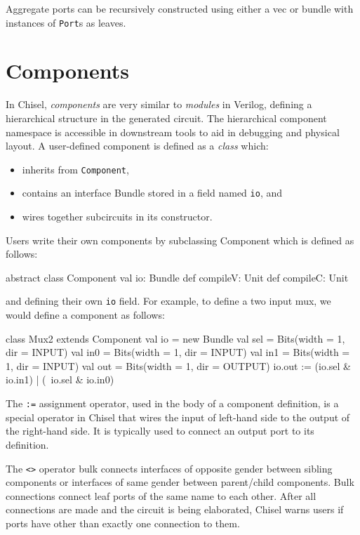 \documentclass[10pt,twocolumn]{article}
\def\code#1{{\small\tt #1}}
\begin{document}
\noindent
Aggregate ports can be recursively constructed using either a vec or
bundle with instances of \code{Port}s as leaves.  

\section{Components}

In Chisel, {\em components} are very similar to {\em modules} in
Verilog, defining a hierarchical structure in the generated circuit.
The hierarchical component namespace is accessible in downstream tools
to aid in debugging and physical layout.  A user-defined component is
defined as a {\em class} which:
\begin{itemize}
\item inherits from \code{Component},
\item contains an interface Bundle stored in a field named \code{io}, and
\item wires together subcircuits in its constructor.
\end{itemize}

Users write their own components by subclassing Component which is
defined as follows:

\begin{scala}
abstract class Component {
  val io: Bundle
  def compileV: Unit
  def compileC: Unit
}
\end{scala}

\noindent
and defining their own \code{io} field.  For example, to define a two
input mux, we would define a component as follows:

\begin{scala}
class Mux2 extends Component {
  val io = new Bundle{
    val sel = Bits(width = 1, dir = INPUT)
    val in0 = Bits(width = 1, dir = INPUT)
    val in1 = Bits(width = 1, dir = INPUT)
    val out = Bits(width = 1, dir = OUTPUT)
  }
  io.out := (io.sel & io.in1) | (~io.sel & io.in0)
}
\end{scala}

\noindent
The \code{:=} assignment operator, used in the body of a
component definition, is a special operator in Chisel that wires the input of
left-hand side to the output of the right-hand side.  It is typically
used to connect an output port to its definition.

The \code{<>} operator bulk connects interfaces of opposite gender between
sibling components or interfaces of same gender between parent/child components. 
Bulk connections connect leaf ports of the same name to each other.
After all connections are made and the circuit is being elaborated,
Chisel warns users if ports have other than exactly one connection to them.
\end{document}
